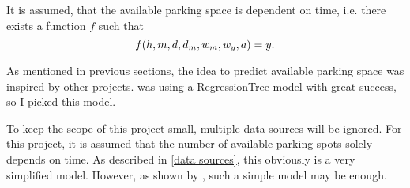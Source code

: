
It is assumed, that the available parking space is dependent on time, i.e. there exists a function \(f\) such that 
\[
f(h, m, d, d_m, w_m, w_y, a) = y\text{.}
\]

As mentioned in previous sections, the idea to predict available parking space was inspired by other projects. \cite{parkendd} was using a RegressionTree model with great success, so I picked this model.

To keep the scope of this project small, multiple data sources will be ignored. For this project, it is assumed that the number of available parking spots solely depends on time. As described in \ref{data sources}, this obviously is a very simplified model. However, as shown by \cite{parkendd}, such a simple model may be enough. 

